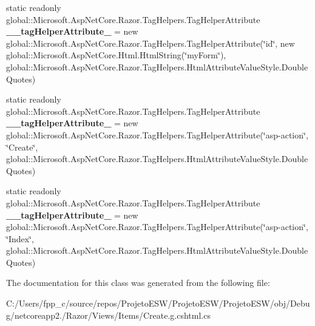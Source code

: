 \begin{DoxyCompactItemize}
static readonly global\+::\+Microsoft.\+Asp\+Net\+Core.\+Razor.\+Tag\+Helpers.\+Tag\+Helper\+Attribute {\bfseries \+\_\+\+\_\+tag\+Helper\+Attribute\+\_} = new global\+::\+Microsoft.\+Asp\+Net\+Core.\+Razor.\+Tag\+Helpers.\+Tag\+Helper\+Attribute(\char`\"{}id\char`\"{}, new global\+::\+Microsoft.\+Asp\+Net\+Core.\+Html.\+Html\+String(\char`\"{}my\+Form\char`\"{}), global\+::\+Microsoft.\+Asp\+Net\+Core.\+Razor.\+Tag\+Helpers.\+Html\+Attribute\+Value\+Style.\+Double\+Quotes)
\item 
\mbox{\label{class_asp_net_core_1_1_views___items___create_adb12f23ac031ac993b16fb9f8380f111}} 
static readonly global\+::\+Microsoft.\+Asp\+Net\+Core.\+Razor.\+Tag\+Helpers.\+Tag\+Helper\+Attribute {\bfseries \+\_\+\+\_\+tag\+Helper\+Attribute\+\_} = new global\+::\+Microsoft.\+Asp\+Net\+Core.\+Razor.\+Tag\+Helpers.\+Tag\+Helper\+Attribute(\char`\"{}asp-\/action\char`\"{}, \char`\"{}Create\char`\"{}, global\+::\+Microsoft.\+Asp\+Net\+Core.\+Razor.\+Tag\+Helpers.\+Html\+Attribute\+Value\+Style.\+Double\+Quotes)
\item 
\mbox{\label{class_asp_net_core_1_1_views___items___create_a304bcede301fb60c53d5d37998705891}} 
static readonly global\+::\+Microsoft.\+Asp\+Net\+Core.\+Razor.\+Tag\+Helpers.\+Tag\+Helper\+Attribute {\bfseries \+\_\+\+\_\+tag\+Helper\+Attribute\+\_} = new global\+::\+Microsoft.\+Asp\+Net\+Core.\+Razor.\+Tag\+Helpers.\+Tag\+Helper\+Attribute(\char`\"{}asp-\/action\char`\"{}, \char`\"{}Index\char`\"{}, global\+::\+Microsoft.\+Asp\+Net\+Core.\+Razor.\+Tag\+Helpers.\+Html\+Attribute\+Value\+Style.\+Double\+Quotes)
\end{DoxyCompactItemize}


The documentation for this class was generated from the following file\+:\begin{DoxyCompactItemize}
\item 
C\+:/\+Users/fpp\+\_\+c/source/repos/\+Projeto\+E\+S\+W/\+Projeto\+E\+S\+W/\+Projeto\+E\+S\+W/obj/\+Debug/netcoreapp2./\+Razor/\+Views/\+Items/Create.\+g.\+cshtml.\+cs\end{DoxyCompactItemize}
